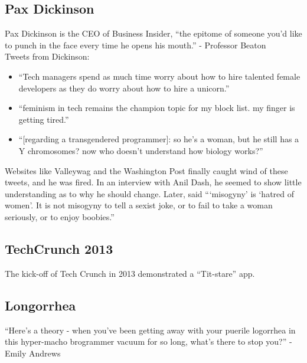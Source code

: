 \documentclass[letterpaper, 12pt]{article}
\begin{document}
\subsection*{Pax Dickinson}
Pax Dickinson is the CEO of Business Insider, ``the epitome of someone you'd
like to punch in the face every time he opens his mouth.'' - Professor Beaton \\
Tweets from Dickinson:
\begin{itemize}
  \item ``Tech managers spend as much time worry about how to hire talented
  female developers as they do worry about how to hire a unicorn.''
  \item ``feminism in tech remains the champion topic for my block list. my
  finger is getting tired.''
  \item ``[regarding a transgendered programmer]: so he's a woman, but he still
  has a Y chromosomes? now who doesn't understand how biology works?''
\end{itemize}
Websites like Valleywag and the Washington Post finally caught wind of these
tweets, and he was fired. In an interview with Anil Dash, he seemed to show
little understanding as to why he should change. Later, said ```misogyny' is
`hatred of women'. It is not misogyny to tell a sexist joke, or to fail to take
a woman seriously, or to enjoy boobies.''

\subsection*{TechCrunch 2013}
The kick-off of Tech Crunch in 2013 demonstrated a ``Tit-stare'' app.

\subsection*{Longorrhea}
``Here's a theory - when you've been getting away with your puerile logorrhea
in this hyper-macho brogrammer vacuum for so long, what's there to stop you?''
- Emily Andrews
\end{document}
